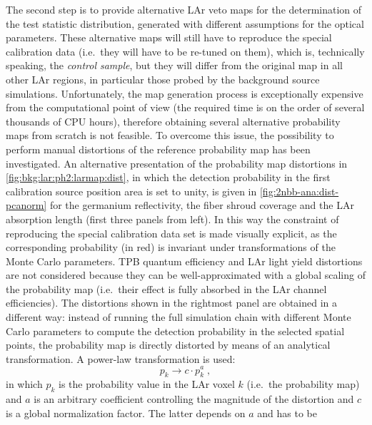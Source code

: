 \begin{description}[wide]
    \newpar
    The second step is to provide alternative LAr veto maps for the determination of the
    test statistic distribution, generated with different assumptions for the optical
    parameters. These alternative maps will still have to reproduce the special
    calibration data (i.e.~they will have to be re-tuned on them), which is, technically
    speaking, the \emph{control sample}, but they will differ from the original map in all
    other LAr regions, in particular those probed by the background source simulations.
    Unfortunately, the map generation process is exceptionally expensive from
    the computational point of view (the required time is on the order of several
    thousands of CPU hours), therefore obtaining several alternative probability maps from
    scratch is not feasible. To overcome this issue, the possibility to perform
    manual distortions of the reference probability map has been investigated.
    \newpar
    An alternative presentation of the probability map distortions in
    \cref{fig:bkg:lar:ph2:larmap:dist}, in which the detection probability in the first
    calibration source position area is set to unity, is given in
    \cref{fig:2nbb-ana:dist-pcanorm} for the germanium reflectivity, the fiber shroud
    coverage and the LAr absorption length (first three panels from left). In this way the
    constraint of reproducing the special calibration data set is made visually explicit,
    as the corresponding probability (in red) is invariant under transformations of the
    Monte Carlo parameters. TPB quantum efficiency and LAr light yield distortions are not
    considered because they can be well-approximated with a global scaling of the
    probability map (i.e.~their effect is fully absorbed in the LAr channel efficiencies).
    The distortions shown in the rightmost panel are obtained in a different way: instead
    of running the full simulation chain with different Monte Carlo parameters to compute
    the detection probability in the selected spatial points, the probability map is
    directly distorted by means of an analytical transformation. A power-law
    transformation is used:
    \begin{equation}\label{eq:2nbb-ana:powerlaw}
      p_k \rightarrow c \cdot p_k^a \;,
    \end{equation}
    in which $p_k$ is the probability value in the LAr voxel $k$ (i.e.~the probability
    map) and $a$ is an arbitrary coefficient controlling the magnitude of the distortion
    and $c$ is a global normalization factor. The latter depends on $a$ and has to be

\end{description}
